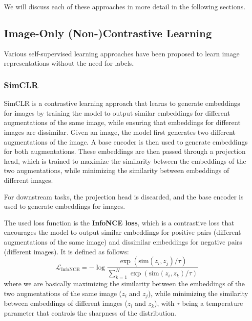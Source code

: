 We will discuss each of these approaches in more detail in the following sections.

\subsection{Image-Only (Non-)Contrastive Learning}
Various self-supervised learning approaches have been proposed to learn image representations without the need for labels.

\subsubsection{SimCLR}
SimCLR is a contrastive learning approach that learns to generate embeddings for images by training the model to output similar embeddings for different augmentations of the same image, while ensuring that embeddings for different images are dissimilar.
Given an image, the model first generates two different augmentations of the image. 
A base encoder is then used to generate embeddings for both augmentations. 
These embeddings are then passed through a projection head, which is trained to maximize the similarity between the embeddings of the two augmentations, while minimizing the similarity between embeddings of different images.

For downstream tasks, the projection head is discarded, and the base encoder is used to generate embeddings for images.

The used loss function is the \textbf{InfoNCE loss}, which is a contrastive loss that encourages the model to output similar embeddings for positive pairs (different augmentations of the same image) and dissimilar embeddings for negative pairs (different images).
It is defined as follows:
\begin{equation}
    \mathcal{L}_{\text{InfoNCE}} = -\log \frac{\exp(\text{sim}(z_i, z_j) / \tau)}{\sum_{k=1}^{N} \exp(\text{sim}(z_i, z_k) / \tau)}
\end{equation}
where we are basically maximizing the similarity between the embeddings of the two augmentations of the same image ($z_i$ and $z_j$), while minimizing the similarity between embeddings of different images ($z_i$ and $z_k$), with $\tau$ being a temperature parameter that controls the sharpness of the distribution.

